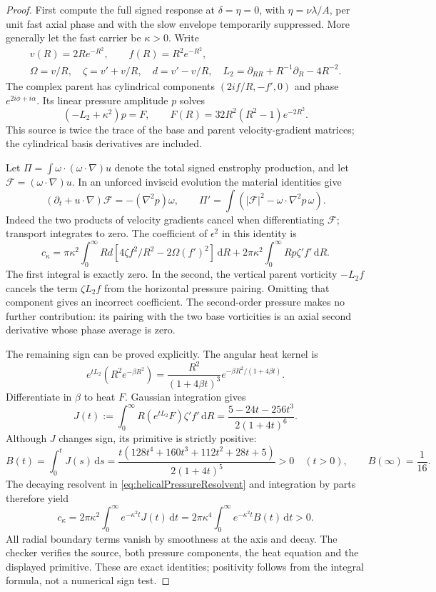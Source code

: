 \documentclass[11pt]{article}
\theoremstyle{remark}
\newcommand{\dd}{\,\mathrm d}
\begin{document}
\begin{proof}
First compute the full signed response at $\delta=\eta=0$, with
$\eta=\nu\lambda/A$, per unit fast axial phase and with the slow
envelope temporarily suppressed. More generally let the fast carrier
be $\kappa>0$. Write
\begin{gather*}
 v(R)=2Re^{-R^2},\qquad f(R)=R^2e^{-R^2},\\
 \Omega=v/R,\quad \zeta=v'+v/R,\quad d=v'-v/R,\quad
 L_2=\partial_{RR}+R^{-1}\partial_R-4R^{-2}.
\end{gather*}
The complex parent has cylindrical components $(2if/R,-f',0)$ and
phase $e^{2i\phi+i\alpha}$. Its linear pressure amplitude $p$ solves
\begin{equation}\label{eq:helicalPressureResolvent}
 (-L_2+\kappa^2)p=F,
 \qquad F(R)=32R^2(R^2-1)e^{-2R^2}.
\end{equation}
This source is twice the trace of the base and parent velocity-gradient
matrices; the cylindrical basis derivatives are included.

Let $\Pi=\int\omega\cdot(\omega\cdot\nabla)u$ denote the total
signed enstrophy production, and let $\mathcal F=(\omega\cdot\nabla)u$.
In an unforced inviscid evolution the material identities give
\[
 (\partial_t+u\cdot\nabla)\mathcal F=-(\nabla^2p)\omega,
 \qquad \Pi'=\int(|\mathcal F|^2-\omega\cdot\nabla^2p\,\omega).
\]
Indeed the two products of velocity gradients cancel when
differentiating $\mathcal F$; transport integrates to zero.
The coefficient of $\epsilon^2$ in this identity is
\[
 c_\kappa=\pi\kappa^2\int_0^\infty
 R d[4\zeta f^2/R^2-2\Omega(f')^2]\dd R
       +2\pi\kappa^2\int_0^\infty R p\zeta'f'\dd R.
\]
The first integral is exactly zero. In the second, the vertical
parent vorticity $-L_2f$ cancels the term $\zeta L_2f$ from the
horizontal pressure pairing. Omitting that component gives an incorrect
coefficient. The second-order pressure makes no further contribution:
its pairing with the two base vorticities is an axial second derivative
whose phase average is zero.

The remaining sign can be proved explicitly. The angular heat kernel is
\[
 e^{tL_2}(R^2e^{-\beta R^2})
    =\frac{R^2}{(1+4\beta t)^3}
                 e^{-\beta R^2/(1+4\beta t)}.
\]
Differentiate in $\beta$ to heat $F$. Gaussian integration gives
\[
 J(t):=\int_0^\infty R(e^{tL_2}F)\zeta'f'\dd R
      =\frac{5-24t-256t^3}{2(1+4t)^6}.
\]
Although $J$ changes sign, its primitive is strictly positive:
\[
 B(t)=\int_0^tJ(s)\dd s
      =\frac{t(128t^4+160t^3+112t^2+28t+5)}{2(1+4t)^5}>0
       \quad(t>0),\qquad B(\infty)=\frac1{16}.
\]
The decaying resolvent in \eqref{eq:helicalPressureResolvent} and
integration by parts therefore yield
\begin{equation}\label{eq:helicalPositiveCoefficient}
 c_\kappa=2\pi\kappa^2\int_0^\infty e^{-\kappa^2t}J(t)\dd t
         =2\pi\kappa^4\int_0^\infty e^{-\kappa^2t}B(t)\dd t>0.
\end{equation}
All radial boundary terms vanish by smoothness at the axis and decay.
The checker verifies the source, both pressure components, the heat
equation and the displayed primitive. These are exact identities;
positivity follows from the integral formula, not a numerical sign test.


\end{proof}
\end{document}
